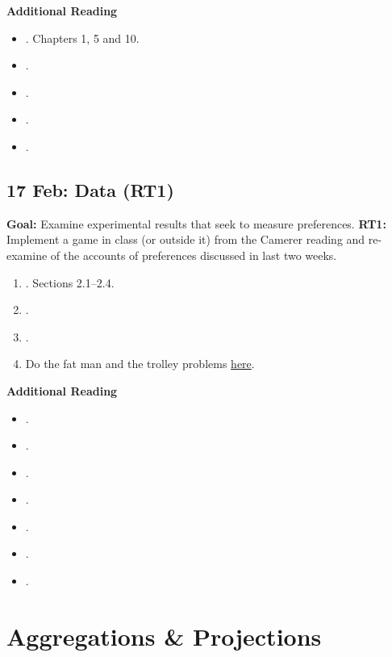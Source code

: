 \documentclass[11pt]{article}
\begin{document}
\textbf{Additional Reading}
\begin{itemize}
\item {}. Chapters 1, 5 and 10.
\item {}.
\item {}.
\item {}.
\item {}.
\end{itemize}



\subsection{17 Feb: Data (RT1)}
\textbf{Goal:} Examine experimental results that seek to measure preferences. \textbf{RT1: }Implement a game in class (or outside it)  from the Camerer reading and re-examine of the accounts of preferences discussed in last two weeks. 
\begin{enumerate}
\item {}. Sections 2.1--2.4.
\item {}.
\item {}.
\item Do the fat man and the trolley problems \href{http://www.philosophyexperiments.com/fatman/Default.aspx}{here}.
\end{enumerate}

\textbf{Additional Reading}
\begin{itemize}
\item {}.
\item {}.
\item {}.
\item {}.
\item {}.
\item {}.
\item {}.
\end{itemize}




\section{Aggregations \& Projections}
\end{document}
